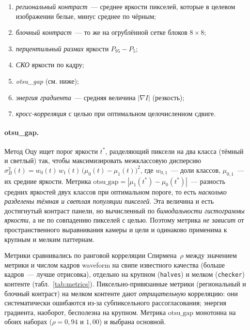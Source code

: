 \begin{enumerate}
    \item \emph{региональный контраст}~--- среднее яркости пикселей, которые в
        целевом изображении белые, минус среднее по чёрным;
    \item \emph{блочный контраст}~--- то же на огрублённой сетке блоков $8\times8$;
    \item \emph{перцентильный размах} яркости $P_{95}-P_{5}$;
    \item \emph{СКО} яркости по кадру;
    \item \emph{otsu\_gap} (см. ниже);
    \item \emph{энергия градиента}~--- средняя величина $|\nabla I|$ (резкость);
    \item \emph{кросс-корреляция} с целью при оптимальном целочисленном сдвиге.
\end{enumerate}

\paragraph{otsu\_gap.} Метод Оцу ищет порог яркости $t^{*}$, разделяющий пиксели на
два класса (тёмный и светлый) так, чтобы максимизировать межклассовую дисперсию
$\sigma_B^2(t)=w_0(t)\,w_1(t)\,\bigl(\mu_0(t)-\mu_1(t)\bigr)^2$, где $w_{0,1}$~---
доли классов, $\mu_{0,1}$~--- их средние яркости. Метрика
$\mathrm{otsu\_gap}=|\mu_1(t^{*})-\mu_0(t^{*})|$~--- разность средних яркостей
двух классов при оптимальном пороге, то есть \emph{насколько разделены тёмная и
светлая популяции пикселей}. Эта величина и есть достигнутый контраст панели,
но вычисленный по \emph{бимодальности гистограммы яркости}, а не по совпадению
пикселей с целью. Поэтому метрика \emph{не зависит} от пространственного
выравнивания камеры и цели и одинаково применима к крупным и мелким паттернам.

Метрики сравнивались по ранговой корреляции Спирмена~$\rho$ между значением метрики
и числом кадров waveform на свипе известного качества (больше кадров~--- лучше
отрисовка), отдельно на крупном (\texttt{halves}) и мелком (\texttt{checker})
контенте (табл.~\ref{tab:metrics}). Пиксельно-привязанные метрики (региональный и
блочный контраст) на мелком контенте дают \emph{отрицательную} корреляцию: они
систематически ошибаются из-за субпиксельного рассогласования; энергия
градиента, наоборот, бесполезна на крупном. Метрика $\mathrm{otsu\_gap}$
монотонна на обоих наборах ($\rho=0{,}94$ и $1{,}00$) и выбрана основной.

